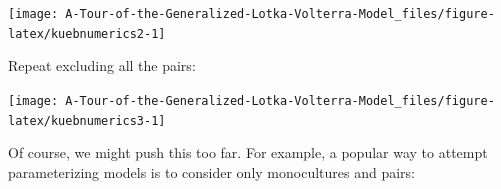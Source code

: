 \documentclass[]{book}
\newenvironment{Shaded}{\begin{snugshade}}{\end{snugshade}}
\newcommand{\DataTypeTok}[1]{\textcolor[rgb]{0.13,0.29,0.53}{#1}}
\newcommand{\DecValTok}[1]{\textcolor[rgb]{0.00,0.00,0.81}{#1}}
\newcommand{\KeywordTok}[1]{\textcolor[rgb]{0.13,0.29,0.53}{\textbf{#1}}}
\newcommand{\NormalTok}[1]{#1}
\newcommand{\OperatorTok}[1]{\textcolor[rgb]{0.81,0.36,0.00}{\textbf{#1}}}
\newcommand{\StringTok}[1]{\textcolor[rgb]{0.31,0.60,0.02}{#1}}
\begin{document}
\begin{center}\texttt{[image: A-Tour-of-the-Generalized-Lotka-Volterra-Model\_files/figure-latex/kuebnumerics2-1]} \end{center}

Repeat excluding all the pairs:

\begin{Shaded}
\end{Shaded}

\begin{center}\texttt{[image: A-Tour-of-the-Generalized-Lotka-Volterra-Model\_files/figure-latex/kuebnumerics3-1]} \end{center}

Of course, we might push this too far. For example, a popular way to attempt parameterizing models is to consider only monocultures and pairs:
\end{document}
